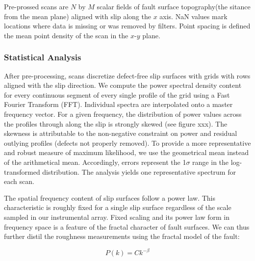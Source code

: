 \documentclass[12pt,a4paper]{article}
\begin{document}
Pre-prossed scans are $N$ by $M$ scalar fields of fault surface topography(the sitance from the mean plane) aligned with slip along the $x$ axis. NaN values mark locations where data is missing or was removed by filters. Point spacing is defined the mean point density of the scan in the $x$-$y$ plane.

	\subsubsection{Statistical Analysis}
		

After pre-processing, scans discretize defect-free slip surfaces with grids with rows aligned with the slip direction. We compute the power spectral density content for every continuous segment of every single profile of the grid using a Fast Fourier Transform (FFT). Individual spectra are interpolated onto a master frequency vector. For a given frequency, the distribution of power values across the profiles through along the slip is strongly skewed (see figure xxx). The skewness is attributable to the non-negative constraint on power and residual outlying profiles (defects not properly removed). To provide a more representative and robust measure of maximum likelihood, we use the geometrical mean instead of the arithmetical mean. Accordingly, errors represent the 1$\sigma$ range in the log-transformed distribution. The analysis yields one representative spectrum for each scan.

The spatial frequency content of slip surfaces follow a power law. This characteristic is roughly fixed for a single slip surface regardless of the scale sampled in our instrumental array. Fixed scaling and its power law form in frequency space is a feature of the fractal character of fault surfaces. We can thus further distil the roughness measurements using the fractal model of the fault:

\begin{equation}
P(k) = Ck^{-\beta}
\end{equation}
\end{document}
